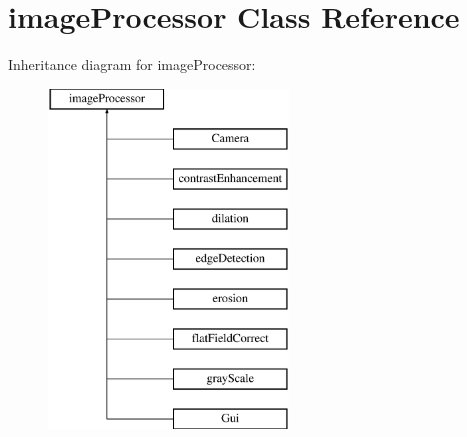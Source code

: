 \hypertarget{classimage_processor}{}\section{image\+Processor Class Reference}
\label{classimage_processor}
Inheritance diagram for image\+Processor\+:\begin{figure}[H]
\begin{center}
\leavevmode
\includegraphics[height=9.000000cm]{classimage_processor}
\end{center}
\end{figure}
